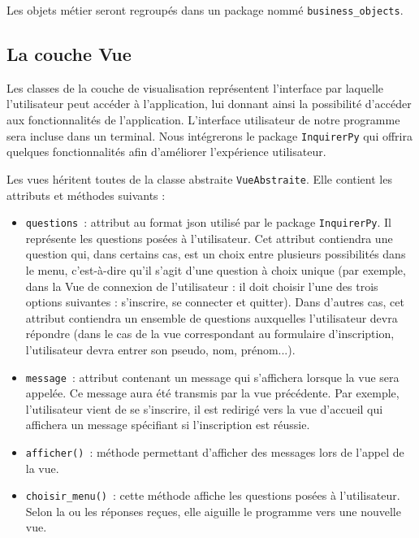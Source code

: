 \documentclass[11pt]{article}
\begin{document}
\bigbreak

Les objets métier seront regroupés dans un package nommé \texttt{business\_objects}.

\subsection{La couche Vue}

Les classes de la couche de visualisation représentent l'interface par laquelle l'utilisateur peut accéder à l'application, lui donnant ainsi la possibilité d'accéder aux fonctionnalités de l'application. L'interface utilisateur de notre programme sera incluse dans un terminal. Nous intégrerons le package \texttt{InquirerPy} qui offrira quelques fonctionnalités afin d'améliorer l'expérience utilisateur.
\bigbreak

Les vues héritent toutes de la classe abstraite \texttt{VueAbstraite}. Elle contient les attributs et méthodes suivants :
\begin{itemize}
    \item \texttt{questions}~: attribut au format json utilisé par le package \texttt{InquirerPy}. Il représente les questions posées à l'utilisateur. Cet attribut contiendra une question qui, dans certains cas, est un choix entre plusieurs possibilités dans le menu, c'est-à-dire qu'il s'agit d'une question à choix unique (par exemple, dans la Vue de connexion de l'utilisateur : il doit choisir l'une des trois options suivantes : s'inscrire, se connecter et quitter). Dans d'autres cas, cet attribut contiendra un ensemble de questions auxquelles l'utilisateur devra répondre (dans le cas de la vue correspondant au formulaire d'inscription, l'utilisateur devra entrer son pseudo, nom, prénom...).
    \item \texttt{message}~: attribut contenant un message qui s'affichera lorsque la vue sera appelée. Ce message aura été transmis par la vue précédente. Par exemple, l'utilisateur vient de se s'inscrire, il est redirigé vers la vue d'accueil qui affichera un message spécifiant si l'inscription est réussie.
    \item \texttt{afficher()}~: méthode permettant d'afficher des messages lors de l'appel de la vue.
    \item \texttt{choisir\_menu()}~: cette méthode affiche les questions posées à l'utilisateur. Selon la ou les réponses reçues, elle aiguille le programme vers une nouvelle vue.
\end{itemize}

\bigbreak
\end{document}
